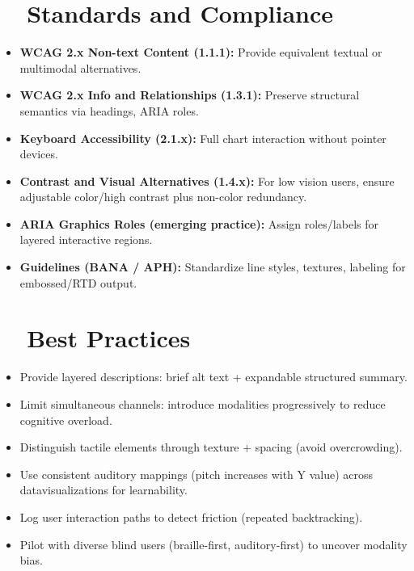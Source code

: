 \section{~~Standards and Compliance}\label{ch13:sec:standards-compliance}
\begin{itemize}
	\item \textbf{WCAG 2.x Non-text Content (1.1.1):} Provide equivalent textual or multimodal alternatives\supercite{WCAG21LevelAA}.
	\item \textbf{WCAG 2.x Info and Relationships (1.3.1):} Preserve structural semantics via headings, ARIA roles.
	\item \textbf{Keyboard Accessibility (2.1.x):} Full chart interaction without pointer devices.
	\item \textbf{Contrast and Visual Alternatives (1.4.x):} For low vision users, ensure adjustable color/high contrast plus non-color redundancy\supercite{ContrastChecker}.
	\item \textbf{ARIA Graphics Roles (emerging practice):} Assign roles/labels for layered interactive regions.
	\item \textbf{ Guidelines (BANA / APH):} Standardize line styles, textures, labeling for embossed/RTD output\supercite{CreatingTactileGraphics}.
\end{itemize}

\section{~~Best Practices}\label{ch13:sec:best-practices}
\begin{itemize}
	\item Provide layered descriptions: brief alt text + expandable structured summary.
	\item Limit simultaneous channels: introduce modalities progressively to reduce cognitive overload.
	\item Distinguish tactile elements through texture + spacing (avoid overcrowding).
	\item Use consistent auditory mappings (pitch increases with Y value) across \gls{datavisualization}s for learnability.
	\item Log user interaction paths to detect  friction (repeated backtracking).
	\item Pilot with diverse blind users (braille-first, auditory-first) to uncover modality bias.
\end{itemize}

